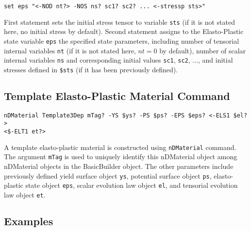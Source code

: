 \begin{verbatim}
set eps "<-NOD nt?> -NOS ns? sc1? sc2? ... <-stressp sts>"
\end{verbatim}

First  statement  sets  the  initial  stress tensor to variable
\texttt{sts} (if it is not stated here, no initial stress by default).  
Second  statement  assigns to the Elasto-Plastic
state  variable  \texttt{eps}  the  specified state parameters,
including
number of  tensorial  internal variables \texttt{nt} 
(if it is not stated here, $nt=0$ by default), 
number of scalar internal variables \texttt{ns} 
and corresponding initial values \texttt{sc1}, \texttt{sc2}, ...,   
and  initial  stresses  defined  in \texttt{\$sts} 
(if it has been previously defined).

\subsection{Template Elasto-Plastic Material Command}
\label{temp_Command}
\begin{verbatim}
nDMaterial Template3Dep mTag? -YS $ys? -PS $ps? -EPS $eps? <-ELS1 $el?> 
<$-ELT1 et?>
\end{verbatim}

A   template   elasto-plastic   material  is  constructed  using
\texttt{nDMaterial}  command.  The  argument  \texttt{mTag} is used to
uniquely  identify  this  nDMaterial  object  among  nDMaterial
objects  in  the  BasicBuilder  object.  The  other  parameters
include  previously  defined  yield surface object \texttt{ys},
potential  surface  object  \texttt{ps},  elasto-plastic  state
object  \texttt{eps},  scalar evolution law object \texttt{el},
and tensorial evolution law object \texttt{et}.


\subsection{Examples}
\label{ep_command_Examples}

